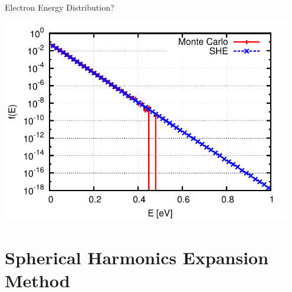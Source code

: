 \documentclass[usepdftitle=false,handout,10pt]{beamer}
\begin{document}
 
% 

\begin{frame} {Electron Energy Distribution?}
 \begin{center}
  \includegraphics[width=0.95\textwidth]{she-monte-carlo-2}
 \end{center}
\end{frame}
 

\section{Spherical Harmonics Expansion Method}
\end{document}
